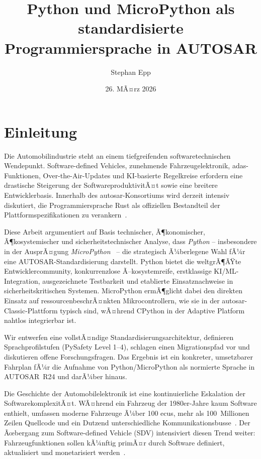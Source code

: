 ﻿\documentclass[12pt,a4paper,twoside]{article}
\title{\textbf{Python und MicroPython als standardisierte Programmiersprache in AUTOSAR}}
\author{Stephan Epp}
\date{26. MÃ¤rz 2026}
\begin{document}
	
\maketitle
\tableofcontents
\clearpage

\section{Einleitung}
\label{sec:einleitung}
Die Automobilindustrie steht an einem tiefgreifenden softwaretechnischen Wendepunkt.
Software-defined Vehicles, zunehmende Fahrzeugelektronik, \gls{adas}-Funktionen,
Over-the-Air-Updates und KI-basierte Regelkreise erfordern eine drastische
Steigerung der SoftwareproduktivitÃ¤t sowie eine breitere Entwicklerbasis.
Innerhalb des \gls{autosar}-Konsortiums wird derzeit intensiv diskutiert,
die Programmiersprache Rust als offiziellen Bestandteil der Plattformspezifikationen
zu verankern~\cite{autosar_rust_wp2023, rust_automotive_safety2022}.

Diese Arbeit argumentiert auf Basis technischer, Ã¶konomischer, Ã¶kosystemischer und
sicherheitstechnischer Analyse, dass \emph{Python} -- insbesondere in der AusprÃ¤gung
\emph{MicroPython}~\cite{micropython_main} -- die strategisch Ã¼berlegene Wahl fÃ¼r
eine AUTOSAR-Standardisierung darstellt.
Python bietet die weltgrÃ¶ÃŸte Entwicklercommunity, konkurrenzlose
Ã–kosystemreife, erstklassige KI/ML-Integration, ausgezeichnete Testbarkeit
und etablierte Einsatznachweise in sicherheitskritischen Systemen.
MicroPython ermÃ¶glicht dabei den direkten Einsatz auf ressourcenbeschrÃ¤nkten
Mikrocontrollern, wie sie in der \gls{autosar}-Classic-Plattform typisch sind,
wÃ¤hrend CPython in der Adaptive Platform nahtlos integrierbar ist.

Wir entwerfen eine vollstÃ¤ndige Standardisierungsarchitektur, definieren
Sprachprofilstufen (PySafety Level 1--4), schlagen einen Migrationspfad vor
und diskutieren offene Forschungsfragen. Das Ergebnis ist ein konkreter,
umsetzbarer Fahrplan fÃ¼r die Aufnahme von Python/MicroPython als normierte
Sprache in AUTOSAR~R24 und darÃ¼ber hinaus.

Die Geschichte der Automobilelektronik ist eine kontinuierliche Eskalation
der SoftwarekomplexitÃ¤t. WÃ¤hrend ein Fahrzeug der 1980er-Jahre kaum
Software enthielt, umfassen moderne Fahrzeuge Ã¼ber 100 \glspl{ecu},
mehr als 100~Millionen Zeilen Quellcode und ein Dutzend unterschiedliche
Kommunikationsbusse~\cite{pretschner2007software, broy2006challenges}.
Der Ãœbergang zum Software-defined Vehicle (SDV) intensiviert diesen Trend
weiter: Fahrzeugfunktionen sollen kÃ¼nftig primÃ¤r durch Software definiert,
aktualisiert und monetarisiert werden~\cite{sdv_mckinsey2023, sdv_bosch2024}.
\end{document}
